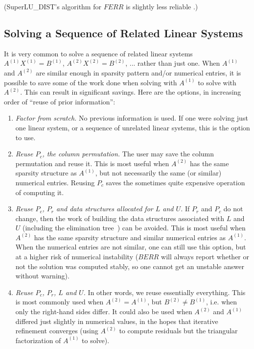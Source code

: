 (SuperLU\_DIST's algorithm for $FERR$ is slightly less reliable
\cite{lidemmel03}.)

\subsection{Solving a Sequence of Related Linear Systems}
\label{sec_SolvingRelatedSystems}

It is very common to solve a sequence of related
linear systems 
$A^{(1)} X^{(1)} = B^{(1)}$,
$A^{(2)} X^{(2)} = B^{(2)}$, ...
rather than
just one. When $A^{(1)}$ and $A^{(2)}$ are similar enough
in sparsity pattern and/or numerical entries, it is possible
to save some of the work done when solving with $A^{(1)}$ to solve 
with $A^{(2)}$. This can result in significant savings.
Here are the options, in increasing order of ``reuse of prior information'':

\begin{enumerate}
\item {\em Factor from scratch.} No previous information is used. If one were
solving just one linear system, or a sequence of unrelated linear systems,
this is the option to use.
\item {\em Reuse $P_c$, the column permutation.} The user may save the
column permutation and reuse it. 
This is most useful when $A^{(2)}$
has the same sparsity structure as $A^{(1)}$, but not necessarily the same
(or similar) numerical entries. 
Reusing $P_c$ saves the sometimes quite expensive operation of computing it.
\item {\em Reuse $P_c$, $P_r$ and data structures allocated for $L$ and $U$.}
If $P_r$ and $P_c$ do not change, then the work of building the data
structures associated with $L$ and $U$ (including the elimination
tree~\cite{GilbertNg-IMA}) can be avoided. 
This is most useful when $A^{(2)}$
has the same sparsity structure and similar numerical entries as $A^{(1)}$.
When the numerical entries are not similar, one can still use this option,
but at a higher risk of numerical instability ($BERR$ will always report
whether or not the solution was computed stably, so one cannot get an
unstable answer without warning).
\item {\em Reuse $P_c$, $P_r$, $L$ and $U$.} In other words, we reuse
essentially everything. This is most commonly used when $A^{(2)} = A^{(1)}$,
but $B^{(2)} \neq B^{(1)}$, i.e. when only the right-hand sides differ.
It could also be used when $A^{(2)}$ and $A^{(1)}$ differed just slightly
in numerical values, in the hopes that iterative refinement converges
(using $A^{(2)}$ to compute residuals but the triangular factorization
of $A^{(1)}$ to solve).
\end{enumerate}

